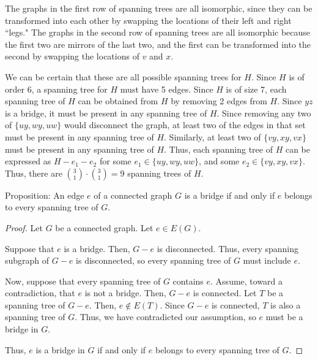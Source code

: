 \documentclass[12pt]{article}
\begin{document}
\begin{center}
    \end{center}

    The graphs in the first row of spanning trees are all isomorphic, since they can be transformed into each other by swapping the locations of their left and right ``legs."
    The graphs in the second row of spanning trees are all isomorphic because the first two are mirrors of the last two, and the first can be transformed into the second by swapping the locations of $v$ and $x$.

    We can be certain that these are all possible spanning trees for $H$. Since $H$ is of order 6, a spanning tree for $H$ must have 5 edges.
    Since $H$ is of size 7, each spanning tree of $H$ can be obtained from $H$ by removing 2 edges from $H$.
    Since $yz$ is a bridge, it must be present in any spanning tree of $H$.
    Since removing any two of $\{uy, wy, uw\}$ would disconnect the graph, at least two of the edges in that set must be present in any spanning tree of $H$.
    Similarly, at least two of $\{vy, xy, vx\}$ must be present in any spanning tree of $H$.
    Thus, each spanning tree of $H$ can be expressed as $H - e_1 - e_2$ for some $e_1 \in \{uy, wy, uw\}$, and some $e_2 \in \{vy, xy, vx\}$.
    Thus, there are ${3 \choose 1} \cdot {3 \choose 1} = 9$ spanning trees of $H$.

\newpage{} Proposition: An edge $e$ of a connected graph $G$ is a bridge if and only if $e$ belongs to every spanning tree of $G$.
\begin{proof}
    Let $G$ be a connected graph.
    Let $e \in E(G)$.

    Suppose that $e$ is a bridge.
    Then, $G-e$ is disconnected.
    Thus, every spanning subgraph of $G-e$ is disconnected, so every spanning tree of $G$ must include $e$.

    Now, suppose that every spanning tree of $G$ contains $e$.
    Assume, toward a contradiction, that $e$ is not a bridge.
    Then, $G-e$ is connected.
    Let $T$ be a spanning tree of $G-e$.
    Then, $e \notin E(T)$.
    Since $G-e$ is connected, $T$ is also a spanning tree of $G$.
    Thus, we have contradicted our assumption, so $e$ must be a bridge in $G$.

    Thus, $e$ is a bridge in $G$ if and only if $e$ belongs to every spanning tree of $G$.
\end{proof}
\end{document}
